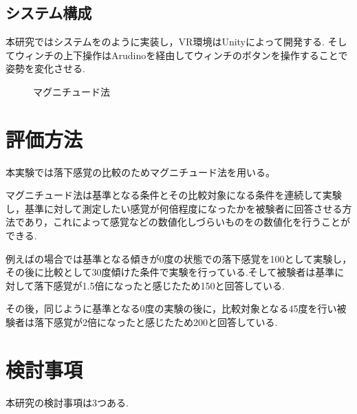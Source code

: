 \documentclass[uplatex]{jsarticle}
\begin{document}
\subsection{システム構成}
本研究ではシステムをのように実装し，VR環境はUnityによって開発する.
そしてウィンチの上下操作はArudinoを経由してウィンチのボタンを操作することで姿勢を変化させる.


 \begin{figure}[tb]
  \centering
  \caption{マグニチュード法}
  \label{fig:magnitude}

\end{figure}

\section{評価方法}
本実験では落下感覚の比較のためマグニチュード法を用いる。

マグニチュード法は基準となる条件とその比較対象になる条件を連続して実験し，基準に対して測定したい感覚が何倍程度になったかを被験者に回答させる方法であり，これによって感覚などの数値化しづらいものをの数値化を行うことができる.

例えばの場合では基準となる傾きが0度の状態での落下感覚を100として実験し，その後に比較として30度傾けた条件で実験を行っている.そして被験者は基準に対して落下感覚が1.5倍になったと感じたため150と回答している.

その後，同じように基準となる0度の実験の後に，比較対象となる45度を行い被験者は落下感覚が2倍になったと感じたため200と回答している.

\section{検討事項}
本研究の検討事項は3つある.
\end{document}
